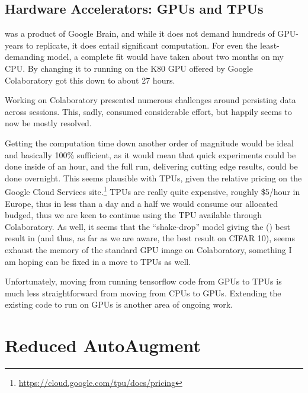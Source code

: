 \documentclass[10pt,twocolumn,letterpaper]{article}
\begin{document}
	\subsection{Hardware Accelerators: GPUs and TPUs}
		\cite{Cubuk2018} was a product of Google Brain, and while it does not demand hundreds of GPU-years to replicate, it does entail significant computation. For even the least-demanding model, a complete fit would have taken about two months on my CPU. By changing it to running on the K80 GPU offered by Google Colaboratory got this down to about 27 hours. 

		Working on Colaboratory presented numerous challenges around persisting data across sessions. This, sadly, consumed considerable effort, but happily seems to now be mostly resolved. 

		Getting the computation time down another order of magnitude would be ideal and basically 100\% sufficient, as it would mean that quick experiments could be done inside of an hour, and the full run, delivering cutting edge results, could be done overnight. This seems plausible with TPUs, given the relative pricing on the Google Cloud Services site.\footnote{\url{https://cloud.google.com/tpu/docs/pricing}} TPUs are really quite expensive, roughly \$5/hour in Europe, thus in less than a day and a half we would consume our allocated budged, thus we are keen to continue using the TPU available through Colaboratory. As well, it seems that the ``shake-drop'' model giving the (\cite{Yamada2018}) best result in \cite{Cubuk2018} (and thus, as far as we are aware, the best result on CIFAR 10), seems exhaust the memory of the standard GPU image on Colaboratory, something I am hoping can be fixed in a move to TPUs as well. 

		Unfortunately, moving from running tensorflow code from GPUs to TPUs is much less straightforward from moving from CPUs to GPUs. Extending the existing code to run on GPUs is another area of ongoing work.
	

\section{Reduced AutoAugment}
\end{document}
